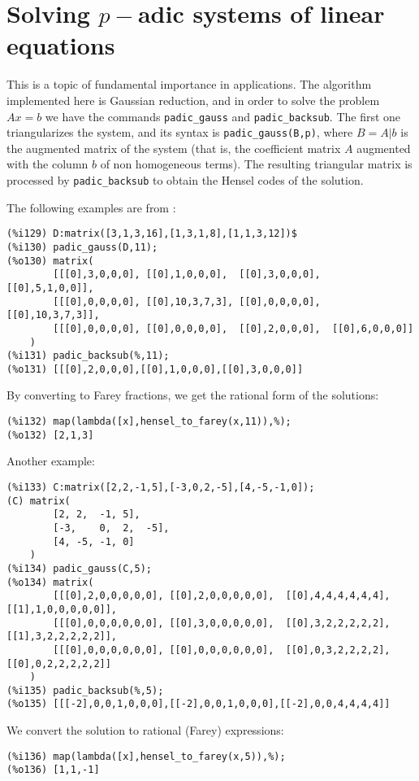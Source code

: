 \documentclass[fleqn]{cas-sc}
\begin{document}
\section{Solving $p-$adic systems of linear equations}\label{sec7}

\noindent This is a topic of fundamental importance in applications. The algorithm
	implemented here is Gaussian reduction, and in order to solve the problem $Ax=b$
	we have the commands \texttt{padic\_gauss} and
	\texttt{padic\_backsub}. The first one triangularizes the system, and its syntax
	is \texttt{padic\_gauss(B,p)}, where $B=A|b$ is the augmented matrix of the system
	(that is, the coefficient matrix $A$ augmented with the column $b$ of non
	homogeneous terms). The resulting triangular matrix is processed
	by \texttt{padic\_backsub} to obtain the Hensel codes of the solution.

The following examples are from \cite{4}:
\begin{verbatim}
(%i129)	D:matrix([3,1,3,16],[1,3,1,8],[1,1,3,12])$
(%i130)	padic_gauss(D,11);
(%o130)	matrix(
		[[[0],3,0,0,0],	[[0],1,0,0,0],	[[0],3,0,0,0],	[[0],5,1,0,0]],
		[[[0],0,0,0,0],	[[0],10,3,7,3],	[[0],0,0,0,0],	[[0],10,3,7,3]],
		[[[0],0,0,0,0],	[[0],0,0,0,0],	[[0],2,0,0,0],	[[0],6,0,0,0]]
	)
(%i131)	padic_backsub(%,11);
(%o131)	[[[0],2,0,0,0],[[0],1,0,0,0],[[0],3,0,0,0]]
\end{verbatim}

By converting to Farey fractions, we get the rational form of the solutions:

\begin{verbatim}
(%i132)	map(lambda([x],hensel_to_farey(x,11)),%);
(%o132)	[2,1,3]
\end{verbatim}

Another example:
\begin{verbatim}
(%i133)	C:matrix([2,2,-1,5],[-3,0,2,-5],[4,-5,-1,0]);
(C)	matrix(
		[2,	2,	-1,	5],
		[-3,	0,	2,	-5],
		[4,	-5,	-1,	0]
	)
(%i134)	padic_gauss(C,5);
(%o134)	matrix(
		[[[0],2,0,0,0,0,0],	[[0],2,0,0,0,0,0],	[[0],4,4,4,4,4,4],	[[1],1,0,0,0,0,0]],
		[[[0],0,0,0,0,0,0],	[[0],3,0,0,0,0,0],	[[0],3,2,2,2,2,2],	[[1],3,2,2,2,2,2]],
		[[[0],0,0,0,0,0,0],	[[0],0,0,0,0,0,0],	[[0],0,3,2,2,2,2],	[[0],0,2,2,2,2,2]]
	)
(%i135)	padic_backsub(%,5);
(%o135)	[[[-2],0,0,1,0,0,0],[[-2],0,0,1,0,0,0],[[-2],0,0,4,4,4,4]]
\end{verbatim}

We convert the solution to rational (Farey) expressions:
\begin{verbatim}
(%i136)	map(lambda([x],hensel_to_farey(x,5)),%);
(%o136)	[1,1,-1]
\end{verbatim}
\end{document}
